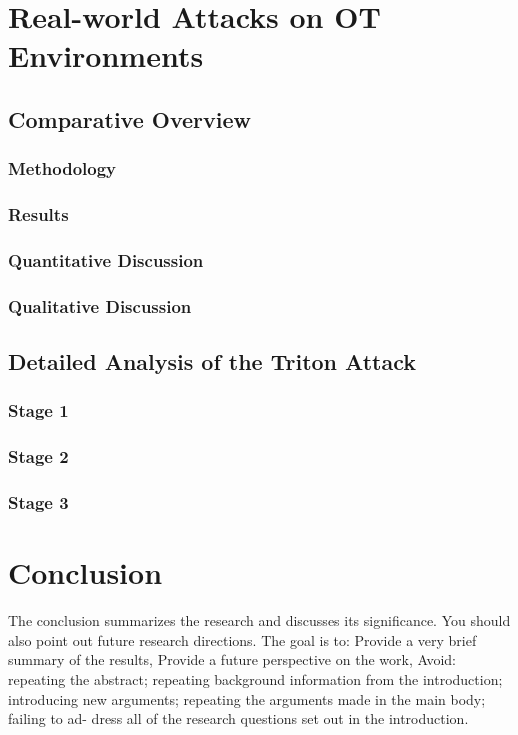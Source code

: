 \documentclass[runningheads]{llncs}
\begin{document}
\section{Real-world Attacks on OT Environments}
\subsection{Comparative Overview}
\subsubsection{Methodology}
\subsubsection{Results}
\subsubsection{Quantitative Discussion}
\subsubsection{Qualitative Discussion}
\subsection{Detailed Analysis of the Triton Attack}
\subsubsection{Stage 1}
\subsubsection{Stage 2}
\subsubsection{Stage 3}
\section{Conclusion}
The conclusion summarizes the research and discusses its significance. You should also point out future research directions. The goal is to: Provide a very brief summary of the results, Provide a future perspective on the work, Avoid: repeating the abstract; repeating background information from the introduction; introducing new arguments; repeating the arguments made in the main body; failing to ad- dress all of the research questions set out in the introduction.
%
%
%


\end{document}
